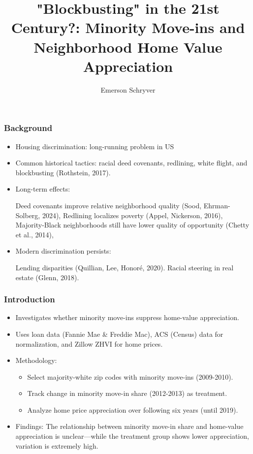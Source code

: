 \documentclass[aspectratio=169]{beamer}
\title[Minority Move-Ins and Home Appreciation]{"Blockbusting" in the 21st Century?: Minority Move-ins and Neighborhood Home Value Appreciation}
\author{Emerson Schryver}
\begin{document}
\begin{frame}
    \maketitle
\end{frame}
\begin{frame}
\frametitle{Background}
\begin{itemize}
    \item Housing discrimination: long-running problem in US
    \item Common historical tactics: racial deed covenants, redlining, white flight, and blockbusting (Rothstein, 2017).
    \item Long-term effects:
    
    \small
    Deed covenants improve relative neighborhood quality (Sood, Ehrman-Solberg, 2024), 
    Redlining localizes poverty (Appel, Nickerson, 2016),
    Majority-Black neighborhoods still have lower quality of opportunity (Chetty et al., 2014),

    \normalsize
    \item Modern discrimination persists:
    
    \small
    Lending disparities (Quillian, Lee, Honoré, 2020).
    Racial steering in real estate (Glenn, 2018).
    
\end{itemize}
\end{frame}
\begin{frame}
\frametitle{Introduction}
\begin{itemize}
    \item Investigates whether minority move-ins suppress home-value appreciation.
    \item Uses loan data (Fannie Mae \& Freddie Mac), ACS (Census) data for normalization, and Zillow ZHVI for home prices.
    \item Methodology:
    \begin{itemize}
        \item Select majority-white zip codes with minority move-ins (2009-2010).
        \item Track change in minority move-in share (2012-2013) as treatment.
        \item Analyze home price appreciation over following six years (until 2019).
    \end{itemize}
    \item Findings: The relationship between minority move-in share and home-value appreciation is unclear—while the treatment group shows lower appreciation, variation is extremely high.
\end{itemize}
\end{frame}
\end{document}
